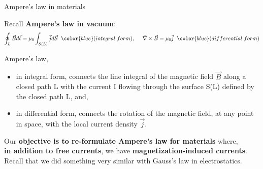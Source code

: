 \begin{frame}{Ampere's law in materials}

Recall {\bf Ampere's law in vacuum}:
\begin{equation*}
  \oint_{L} \vec{B} d\vec{\ell} = \mu_0 \int_{S(L)} \vec{j} d\vec{S} \;\;
  {\color{blue}(integral\;form)},
  \;\;\;\;\;
  \vec{\nabla} \times \vec{B} = \mu_0 \vec{j} \;\;
  {\color{blue}(differential\;form)}
\end{equation*}

Ampere's law,
\begin{itemize}
     \item in integral form, connects the line integral of the
               magnetic field $\vec{B}$ along a closed path L with the current I
               flowing through the surface S(L) defined by the closed path L, and,
     \item in differential form, connects the rotation of the magnetic field,
               at any point in space, with the local current density $\vec{j}$.\\
 \end{itemize}

\vspace{0.2cm}

Our {\bf objective is to re-formulate Ampere's law for materials} where, \\
{\bf in addition to free currents}, we have {\bf magnetization-induced currents}.\\

\vspace{0.2cm}
Recall that we did something very similar with Gauss's law in electrostatics. \\

\end{frame}


